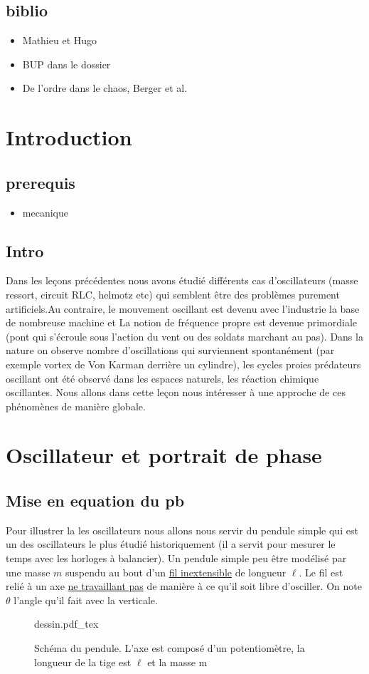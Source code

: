 \documentclass{article}
\begin{document}
\subsection*{biblio}
\begin{itemize}
	\item Mathieu et Hugo
	\item BUP dans le dossier
	\item De l'ordre dans le chaos, Berger et al.
\end{itemize}


\section{Introduction}
\subsection{prerequis}
\begin{itemize}
\item mecanique 
\end{itemize}
\subsection{Intro}
Dans les leçons précédentes nous avons étudié différents cas d'oscillateurs (masse ressort, circuit RLC, helmotz etc) qui semblent être des problèmes purement artificiels.Au contraire, le mouvement oscillant est devenu avec l'industrie la base de nombreuse machine et La notion de fréquence propre est devenue primordiale (pont qui s'écroule sous l'action du vent ou des soldats marchant au pas). Dans la nature on observe nombre d'oscillations qui surviennent spontanément (par exemple vortex de Von Karman derrière un cylindre), les cycles proies prédateurs oscillant ont été observé dans les espaces naturels, les réaction chimique oscillantes. Nous allons dans cette leçon nous intéresser à une approche de ces phénomènes de manière globale.
\section{Oscillateur et portrait de phase}

\subsection{Mise en equation du pb}
Pour illustrer la les oscillateurs  nous allons nous servir du pendule simple qui est un des oscillateurs le plus étudié historiquement (il a servit pour mesurer le temps avec les horloges à balancier). Un pendule simple peu être  modélisé par une masse $m$ suspendu au bout d'un 
\uline{fil inextensible} de longueur 
$\ell$. Le fil est relié à un axe  \uline{ne travaillant pas} de manière à ce qu'il soit libre d'osciller. On note $\theta$ l'angle qu'il fait avec la verticale. 
\begin{figure}
   \centering
   \def\svgwidth{0.50\textwidth}
  \large
   {dessin.pdf_tex}
   \caption{Schéma du pendule. L'axe est composé d'un potentiomètre, la longueur de la tige est $\ell$ et la masse m}
   \label{fig:pendule}
\end{figure}
\end{document}
